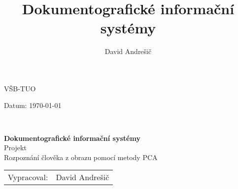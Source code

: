 \documentclass[10pt,a4paper]{article}
\author{David Andrešič}
\title{Dokumentografické informační systémy}
\begin{document}
\begin{titlepage}

\begin{minipage}{0.4\textwidth}
\begin{flushleft}
VŠB-TUO
\end{flushleft}
\end{minipage}
\begin{minipage}{0.4\textwidth}
\begin{flushright}
Datum: \today
\end{flushright}
\end{minipage}\\[5.0cm]


\begin{center}

{\huge \bfseries Dokumentografické informační systémy}\\[1.0cm]
{\huge Projekt}\\[1.5cm]
{\large Rozpoznání člověka z obrazu pomocí metody PCA}\\[4cm]

\end{center}

	
	

\vfill

\begin{minipage}{0.4\textwidth}
\begin{flushleft}
\begin{tabular}{lp{9cm}}
Vypracoval:&	David Andrešič	\\
\end{tabular}
\end{flushleft}
\end{minipage}

\end{titlepage}
\tableofcontents
\end{document}
